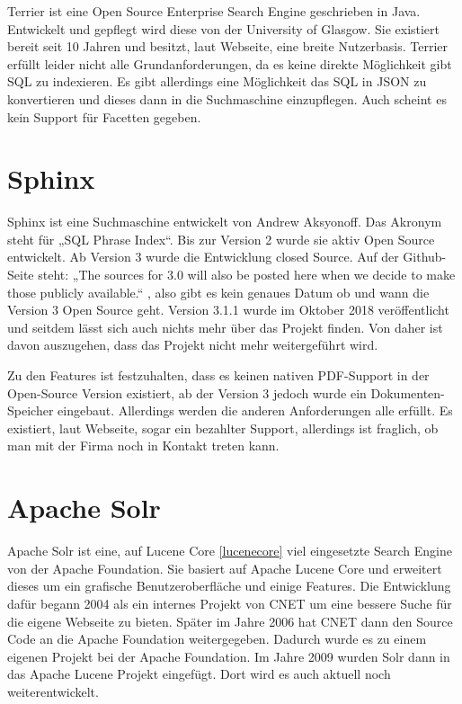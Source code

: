 Terrier ist eine Open Source Enterprise Search Engine geschrieben in Java. Entwickelt und gepflegt wird diese von der University of Glasgow. Sie existiert bereit seit 10 Jahren und besitzt, laut Webseite, eine breite Nutzerbasis. 
Terrier erfüllt leider nicht alle Grundanforderungen, da es keine direkte Möglichkeit gibt SQL zu indexieren. Es gibt allerdings eine Möglichkeit das SQL in JSON zu konvertieren und dieses dann in die Suchmaschine einzupflegen. Auch scheint es kein Support für Facetten gegeben.
\cite{McCreadie.2019}

\section{Sphinx}
\label{sphinx}

Sphinx ist eine Suchmaschine entwickelt von Andrew Aksyonoff. Das Akronym steht für „SQL Phrase Index“.\cite{SphinxTechnologiesInc.b} Bis zur Version 2 wurde sie aktiv Open Source entwickelt. Ab Version 3 wurde die Entwicklung closed Source. Auf der Github-Seite steht: „The sources for 3.0 will also be posted here when we decide to make those publicly available.“ \cite{sphinxserach.2019}, also gibt es kein genaues Datum ob und wann die Version 3 Open Source geht. Version 3.1.1 wurde im Oktober 2018 veröffentlicht und seitdem lässt sich auch nichts mehr über das Projekt finden. Von daher ist davon auszugehen, dass das Projekt nicht mehr weitergeführt wird. 

Zu den Features ist festzuhalten, dass es keinen nativen PDF-Support in der Open-Source Version existiert, ab der Version 3 jedoch wurde ein Dokumenten-Speicher eingebaut. Allerdings werden die anderen Anforderungen alle erfüllt. Es existiert, laut Webseite, sogar ein bezahlter Support, allerdings ist fraglich, ob man mit der Firma noch in Kontakt treten kann. \cite{SphinxTechnologiesInc.2019}

\section{Apache Solr}
\label{solr}

Apache Solr ist eine, auf Lucene Core \ref{lucenecore} viel eingesetzte Search Engine von der Apache Foundation. Sie basiert auf Apache Lucene Core und erweitert dieses um ein grafische Benutzeroberfläche und einige Features. 
Die Entwicklung dafür begann 2004 als ein internes Projekt von CNET um eine bessere Suche für die eigene Webseite zu bieten. Später im Jahre 2006 hat CNET dann den Source Code an die Apache Foundation weitergegeben. Dadurch wurde  es zu einem eigenen Projekt bei der Apache Foundation. Im Jahre 2009 wurden Solr dann in das Apache Lucene Projekt eingefügt. Dort wird es auch aktuell noch weiterentwickelt. \cite{Wikipedia.2019b}

